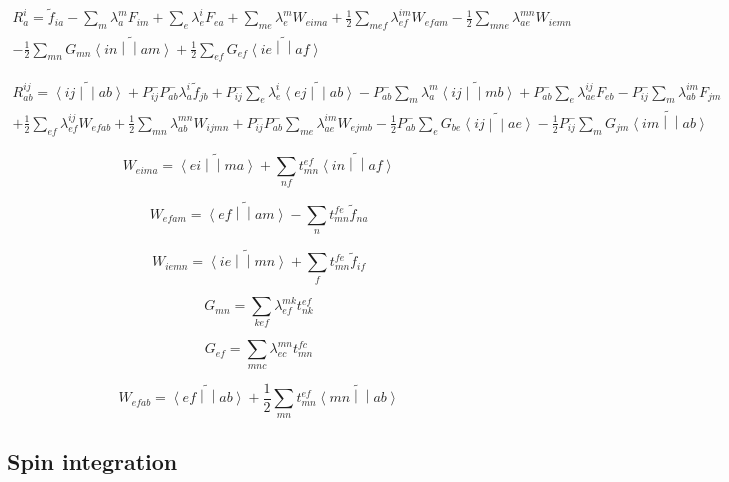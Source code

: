 \documentclass{article}
\newcommand{\tei}[2]{\left<{#1}\middle|\middle|{#2}\right>}
\begin{document}
\begin{multline}
  R_a^i = \tilde{f}_{ia} - \sum_m\lambda_a^mF_{im} + \sum_e\lambda_e^iF_{ea} + \sum_{me}\lambda_e^mW_{eima} + \frac{1}{2}\sum_{mef}\lambda_{ef}^{im}W_{efam} - \frac{1}{2}\sum_{mne}\lambda_{ae}^{mn}W_{iemn}\\
  - \frac{1}{2}\sum_{mn}G_{mn}\widetilde{\tei{in}{am}} + \frac{1}{2}\sum_{ef}G_{ef}\widetilde{\tei{ie}{af}}
\end{multline}

\begin{multline}
  R_{ab}^{ij} = \widetilde{\tei{ij}{ab}} + P_{ij}^-P_{ab}^-\lambda_a^i\tilde{f}_{jb} + P_{ij}^-\sum_e\lambda_e^i\widetilde{\tei{ej}{ab}} - P_{ab}^-\sum_m\lambda_a^m\widetilde{\tei{ij}{mb}} + P_{ab}^-\sum_e\lambda_{ae}^{ij}F_{eb} - P_{ij}^-\sum_m\lambda_{ab}^{im}F_{jm} \\
  + \frac{1}{2}\sum_{ef}\lambda_{ef}^{ij}W_{efab} + \frac{1}{2}\sum_{mn}\lambda_{ab}^{mn}W_{ijmn} + P_{ij}^-P_{ab}^-\sum_{me}\lambda_{ae}^{im}W_{ejmb} - \frac{1}{2}P_{ab}^-\sum_eG_{be}\widetilde{\tei{ij}{ae}} - \frac{1}{2}P_{ij}^-\sum_mG_{jm}\widetilde{\tei{im}{ab}}
\end{multline}

\begin{equation}
  W_{eima} = \widetilde{\tei{ei}{ma}} + \sum_{nf}t_{mn}^{ef}\widetilde{\tei{in}{af}}
\end{equation}

\begin{equation}
  W_{efam} = \widetilde{\tei{ef}{am}} - \sum_nt_{mn}^{fe}\tilde{f}_{na}
\end{equation}

\begin{equation}
  W_{iemn} = \widetilde{\tei{ie}{mn}} + \sum_ft_{mn}^{fe}\tilde{f}_{if}
\end{equation}

\begin{equation}
  G_{mn} = \sum_{kef} \lambda_{ef}^{mk}t_{nk}^{ef}
\end{equation}

\begin{equation}
  G_{ef} = \sum_{mnc} \lambda_{ec}^{mn}t_{mn}^{fc}
\end{equation}

\begin{equation}
  W_{efab} = \widetilde{\tei{ef}{ab}} + \frac{1}{2}\sum_{mn}t_{mn}^{ef}\widetilde{\tei{mn}{ab}}
\end{equation}

\subsection{Spin integration}
\end{document}
